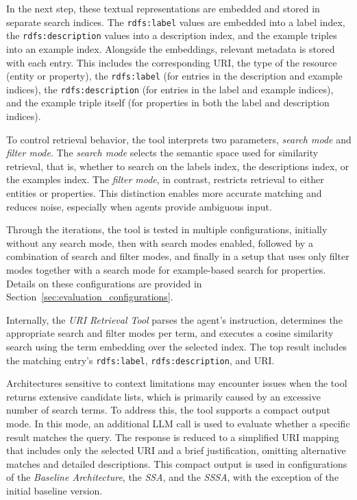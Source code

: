 \documentclass[a4paper,oneside,bibliography=totoc]{scrbook}
\begin{document}
In the next step, these textual representations are embedded and stored in separate search indices. The \texttt{rdfs:label} values are embedded into a label index, the \texttt{rdfs:description} values into a description index, and the example triples into an example index. Alongside the embeddings, relevant metadata is stored with each entry. This includes the corresponding \ac{URI}, the type of the resource (entity or property), the \texttt{rdfs:label} (for entries in the description and example indices), the \texttt{rdfs:description} (for entries in the label and example indices), and the example triple itself (for properties in both the label and description indices).

To control retrieval behavior, the tool interprets two parameters, \textit{search mode} and \textit{filter mode}. The \textit{search mode} selects the semantic space used for similarity retrieval, that is, whether to search on the labels index, the descriptions index, or the examples index. The \textit{filter mode}, in contrast, restricts retrieval to either entities or properties. This distinction enables more accurate matching and reduces noise, especially when agents provide ambiguous input.

Through the iterations, the tool is tested in multiple configurations, initially without any search mode, then with search modes enabled, followed by a combination of search and filter modes, and finally in a setup that uses only filter modes together with a search mode for example-based search for properties. Details on these configurations are provided in Section~\ref{sec:evaluation_configurations}.

Internally, the \textit{\ac{URI} Retrieval Tool} parses the agent’s instruction, determines the appropriate search and filter modes per term, and executes a cosine similarity search using the term embedding over the selected index. The top result includes the matching entry’s \texttt{rdfs:label}, \texttt{rdfs:description}, and \ac{URI}.

Architectures sensitive to context limitations may encounter issues when the tool returns extensive candidate lists, which is primarily caused by an excessive number of search terms. To address this, the tool supports a compact output mode. In this mode, an additional \ac{LLM} call is used to evaluate whether a specific result matches the query. The response is reduced to a simplified \ac{URI} mapping that includes only the selected \ac{URI} and a brief justification, omitting alternative matches and detailed descriptions. This compact output is used in configurations of the \textit{Baseline Architecture}, the \textit{\ac{SSA}}, and the \textit{\ac{SSSA}}, with the exception of the initial baseline version.
\end{document}
